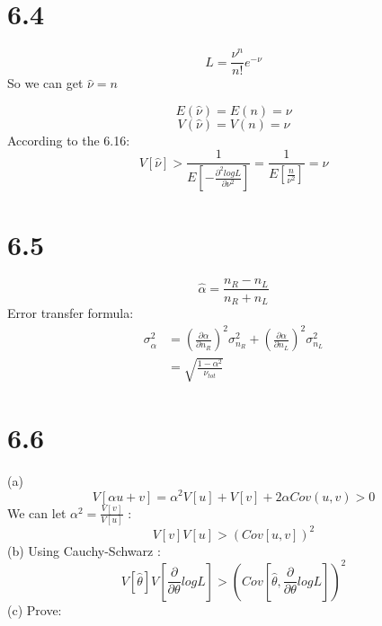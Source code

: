 \documentclass{article}
\begin{document}
\begin{CJK*}{GBK}{song}
 \section{6.4}
 \begin{equation}
 L=\frac{\nu^n}{n!}e^{-\nu}
 \end{equation}
 So we can get $\hat{\nu}=n$
 
 \begin{equation}
 E(\hat{\nu})=E(n)=\nu
 \end{equation}
  \begin{equation}
 V(\hat{\nu})=V(n)=\nu
 \end{equation}
 According to the 6.16:
 \begin{equation}
 V[\hat{\nu}]>\frac{1}{E[-\frac{\partial^2logL}{\partial\nu^2}]}=\frac{1}{E[\frac{n}{\nu^2}]}=\nu
 \end{equation}
 
 
 \section{6.5}
 \begin{equation}
 \hat{\alpha}=\frac{n_R-n_L}{n_R+n_L}
 \end{equation}
 Error transfer formula:
 \begin{equation}
\begin{aligned}
\sigma^2_{\hat{\alpha}}&=(\frac{\partial\alpha}{\partial n_R})^2\sigma^2_{n_R}+(\frac{\partial\alpha}{\partial n_L})^2\sigma^2_{n_L}\\
&=\sqrt{\frac{1-\alpha^2}{\nu_{tot}}}
\end{aligned}
 \end{equation}
 
\section{6.6}
 (a)
 \begin{equation}
 V[\alpha u+v]=\alpha^2 V[u]+V[v]+2\alpha Cov(u,v)>0
 \end{equation}
We can let $\alpha^2=\frac{V[v]}{V[u]}$ :
\begin{equation}
V[v]V[u]>(Cov[u,v])^2
\end{equation}
 (b)
 Using Cauchy-Schwarz :
 \begin{equation}
 V[\hat{\theta}]V[\frac{\partial}{\partial \theta }logL]>(Cov[\hat{\theta},\frac{\partial}{\partial \theta }logL])^2
 \end{equation}
 (c)
 Prove:
 \begin{equation}
 

\end{equation}
\end{CJK*}
\end{document}
